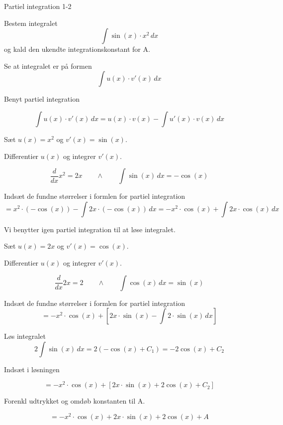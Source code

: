 \documentclass{article}
\begin{document}
\begin{exercise}{Partiel integration 1-2}


Bestem integralet
\[
\int \sin(x) \cdot x^2 \, dx
\]
og kald den ukendte integrationskonstant for A.



\hint

Se at integralet er på formen
\[
\int u(x) \cdot v'(x) \, dx
\]

\hint

Benyt partiel integration

\hint
\[
\int u(x) \cdot v'(x)\, dx = u(x) \cdot v(x) - \int u'(x) \cdot v(x) \, dx
\]
\hint

Sæt $u(x) = x^2$ og $v'(x) = \sin(x)$.


\hint

Differentier $u(x)$ og integrer $v'(x)$.

\hint
\[
\frac{d}{dx}x^2 = 2x \qquad \wedge \qquad \int \sin(x) \, dx = - \cos(x)
\]

\hint

Indsæt de fundne størrelser i formlen for partiel integration
\[
= x^2 \cdot (- \cos(x)) - \int 2x \cdot (- \cos(x)) \, dx = -x^2 \cdot \cos(x) + \int 2x \cdot \cos(x) \, dx
\]

\hint

Vi benytter igen partiel integration til at løse integralet.

\hint

Sæt $u(x) = 2x$ og $v'(x) = \cos(x)$.


\hint

Differentier $u(x)$ og integrer $v'(x)$.

\hint
\[
\frac{d}{dx}2x = 2 \qquad \wedge \qquad \int \cos(x) \, dx = \sin(x)
\]

\hint

Indsæt de fundne størrelser i formlen for partiel integration
\[
= -x^2 \cdot \cos(x) + \left[ 2x \cdot \sin(x) - \int 2 \cdot \sin(x) \, dx \right]
\]

\hint
Løs integralet
\[
2 \int \sin(x) \, dx = 2 (- \cos(x) + C_1) = -2\cos(x) + C_2
\]

\hint
Indsæt i løsningen

\hint

\[
= -x^2 \cdot \cos(x) + \left[ 2x \cdot \sin(x) + 2\cos(x) + C_2 \right]
\]

\hint

Forenkl udtrykket og omdøb konstanten til A.

\hint

\[
= -x^2 \cdot \cos(x) + 2x \cdot \sin(x) + 2\cos(x) + A
\]


\end{exercise}
\end{document}
